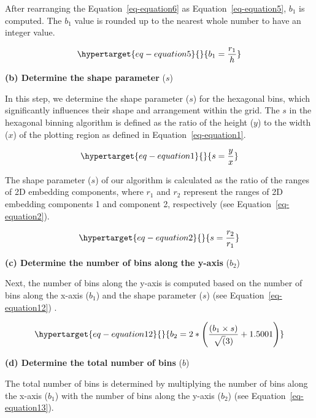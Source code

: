 \documentclass[
  12pt]{article}
\begin{document}
After rearranging the Equation~\ref{eq-equation6} as
Equation~\ref{eq-equation5}, \(b_1\) is computed. The \(b_1\) value is
rounded up to the nearest whole number to have an integer value.

\begin{equation}\protect\hypertarget{eq-equation5}{}{
b_1 = \frac{r_1}{h}
}\label{eq-equation5}\end{equation}

\textbf{(b) Determine the shape parameter} (\(s\))

In this step, we determine the shape parameter (\(s\)) for the hexagonal
bins, which significantly influences their shape and arrangement within
the grid. The \(s\) in the hexagonal binning algorithm is defined as the
ratio of the height (\(y\)) to the width (\(x\)) of the plotting region
as defined in Equation~\ref{eq-equation1}.

\begin{equation}\protect\hypertarget{eq-equation1}{}{
s = \frac{y}{x}
}\label{eq-equation1}\end{equation}

The shape parameter (\(s\)) of our algorithm is calculated as the ratio
of the ranges of 2D embedding components, where \(r_1\) and \(r_2\)
represent the ranges of 2D embedding components 1 and component 2,
respectively (see Equation~\ref{eq-equation2}).

\begin{equation}\protect\hypertarget{eq-equation2}{}{
s = \frac{r_2}{r_1}
}\label{eq-equation2}\end{equation}

\textbf{(c) Determine the number of bins along the y-axis} (\(b_2\))

Next, the number of bins along the y-axis is computed based on the
number of bins along the x-axis (\(b_1\)) and the shape parameter
(\(s\)) (see Equation~\ref{eq-equation12}) \citep{Carr2013}.

\begin{equation}\protect\hypertarget{eq-equation12}{}{
b_2 = 2 * \left(\frac{(b_1 \times s)}{\sqrt(3)} + 1.5001 \right)
}\label{eq-equation12}\end{equation}

\textbf{(d) Determine the total number of bins} (\(b\))

The total number of bins is determined by multiplying the number of bins
along the x-axis (\(b_1\)) with the number of bins along the y-axis
(\(b_2\)) (see Equation~\ref{eq-equation13}).
\end{document}
